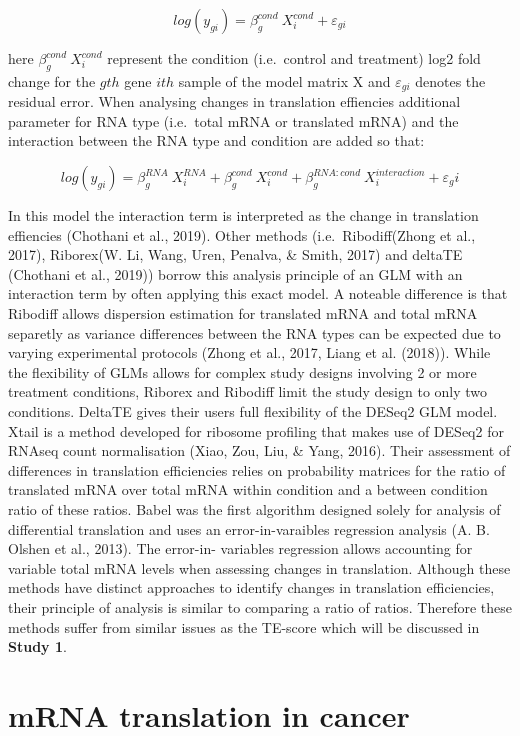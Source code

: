 \documentclass[12pt,openany]{book}
\begin{document}
\[log(y_{gi}) = \beta_g^{cond}\ X_i^{cond} + \varepsilon_{gi}\]

here \(\beta_g^{cond}\ X_i^{cond}\) represent the condition
(i.e.~control and treatment) log2 fold change for the \(gth\) gene
\(ith\) sample of the model matrix X and \(\varepsilon_{gi}\) denotes
the residual error. When analysing changes in translation effiencies
additional parameter for RNA type (i.e.~total mRNA or translated mRNA)
and the interaction between the RNA type and condition are added so
that:

\[log(y_{gi}) = \beta_g^{RNA}\ X_i^{RNA}+ \beta_g^{cond}\ X_i^{cond} + \beta_g^{RNA:cond}\ X_i^{interaction} + \varepsilon_gi\]

In this model the interaction term is interpreted as the change in
translation effiencies (Chothani et al., 2019). Other methods
(i.e.~Ribodiff(Zhong et al., 2017), Riborex(W. Li, Wang, Uren, Penalva,
\& Smith, 2017) and deltaTE (Chothani et al., 2019)) borrow this
analysis principle of an GLM with an interaction term by often applying
this exact model. A noteable difference is that Ribodiff allows
dispersion estimation for translated mRNA and total mRNA separetly as
variance differences between the RNA types can be expected due to
varying experimental protocols (Zhong et al., 2017, Liang et al.
(2018)). While the flexibility of GLMs allows for complex study designs
involving 2 or more treatment conditions, Riborex and Ribodiff limit the
study design to only two conditions. DeltaTE gives their users full
flexibility of the DESeq2 GLM model. Xtail is a method developed for
ribosome profiling that makes use of DESeq2 for RNAseq count
normalisation (Xiao, Zou, Liu, \& Yang, 2016). Their assessment of
differences in translation efficiencies relies on probability matrices
for the ratio of translated mRNA over total mRNA within condition and a
between condition ratio of these ratios. Babel was the first algorithm
designed solely for analysis of differential translation and uses an
error-in-varaibles regression analysis (A. B. Olshen et al., 2013). The
error-in- variables regression allows accounting for variable total mRNA
levels when assessing changes in translation. Although these methods
have distinct approaches to identify changes in translation
efficiencies, their principle of analysis is similar to comparing a
ratio of ratios. Therefore these methods suffer from similar issues as
the TE-score which will be discussed in \textbf{Study 1}.

\section{mRNA translation in cancer}
\end{document}
